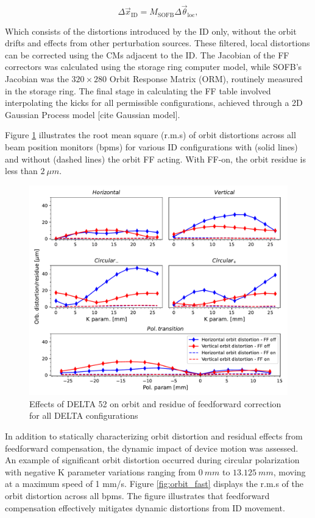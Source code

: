 \documentclass[a4paper,
               keeplastbox,   %
               ]{jacow}
\begin{document}
\begin{equation}
    \Delta\vec{x}_{\text{ID}} = M_{\text{SOFB}}\Delta\vec{\theta}_{\text{loc}},
\end{equation}

Which consists of the distortions introduced by the ID only, without the orbit drifts and effects from other perturbation sources. These filtered, local distortions can be corrected using the CMs adjacent to the ID. The Jacobian of the FF correctors was calculated using the storage ring computer model, while  SOFB's Jacobian was the  $320\times 280$ Orbit Response Matrix (ORM), routinely measured in the storage ring.  The final stage in calculating the FF table involved interpolating the kicks for all permissible configurations, achieved through a 2D Gaussian Process model [cite Gaussian model].  

Figure \ref{fig:orbit_slow} illustrates the root mean square (r.m.s) of orbit distortions across all beam position monitors (bpms) for various ID configurations with (solid lines) and without (dashed lines) the orbit FF acting. With FF-on,  the orbit residue is less than $\SI{2}{\mu m}$.

\begin{figure}[!h]
    \centering
   \includegraphics[width=\columnwidth]{Orbit_dist.pdf}
   \caption{Effects of DELTA 52 on orbit and residue of feedforward correction for all DELTA configurations}
   \label{fig:orbit_slow}
\end{figure}

In addition to statically characterizing orbit distortion and residual effects from feedforward compensation, the dynamic impact of device motion was assessed. An example of significant orbit distortion occurred during circular polarization with negative K parameter variations ranging from $\SI{0}{mm}$ to $\SI{13.125}{mm}$, moving at a maximum speed of 1 mm/s. Figure \ref{fig:orbit_fast} displays the r.m.s of the orbit distortion across all bpms. The figure illustrates that feedforward compensation effectively mitigates dynamic distortions from ID movement.
\end{document}
